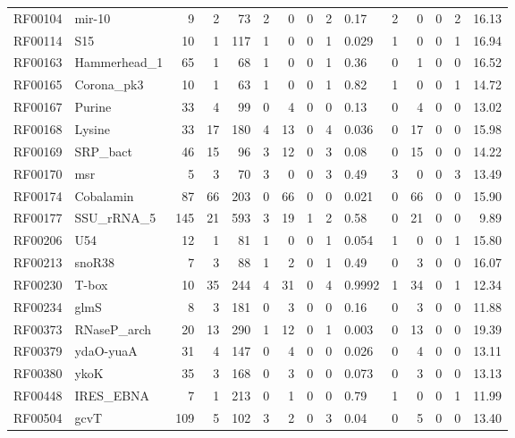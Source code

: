 \begin{table}
\begin{center}
\begin{tabular}{|ll|rrr|rrrrl|rrrrr|}
RF00104 & mir-10 & 9 & 2 & 73 & 2 & 0 & 0 & 2 &   0.17 & 2 & 0 & 0 & 2 &  16.13 \\  
RF00114 & S15 & 10 & 1 & 117 & 1 & 0 & 0 & 1 &  0.029 & 1 & 0 & 0 & 1 &  16.94 \\  
RF00163 & Hammerhead\_1 & 65 & 1 & 68 & 1 & 0 & 0 & 1 &   0.36 & 0 & 1 & 0 & 0 &  16.52 \\  
RF00165 & Corona\_pk3 & 10 & 1 & 63 & 1 & 0 & 0 & 1 &   0.82 & 1 & 0 & 0 & 1 &  14.72 \\  
RF00167 & Purine & 33 & 4 & 99 & 0 & 4 & 0 & 0 &   0.13 & 0 & 4 & 0 & 0 &  13.02 \\  
RF00168 & Lysine & 33 & 17 & 180 & 4 & 13 & 0 & 4 &  0.036 & 0 & 17 & 0 & 0 &  15.98 \\  
RF00169 & SRP\_bact & 46 & 15 & 96 & 3 & 12 & 0 & 3 &   0.08 & 0 & 15 & 0 & 0 &  14.22 \\  
RF00170 & msr & 5 & 3 & 70 & 3 & 0 & 0 & 3 &   0.49 & 3 & 0 & 0 & 3 &  13.49 \\  
RF00174 & Cobalamin & 87 & 66 & 203 & 0 & 66 & 0 & 0 &  0.021 & 0 & 66 & 0 & 0 &   15.90 \\  
RF00177 & SSU\_rRNA\_5 & 145 & 21 & 593 & 3 & 19 & 1 & 2 &   0.58 & 0 & 21 & 0 & 0 &   9.89 \\  
RF00206 & U54 & 12 & 1 & 81 & 1 & 0 & 0 & 1 &  0.054 & 1 & 0 & 0 & 1 &   15.80 \\  
RF00213 & snoR38 & 7 & 3 & 88 & 1 & 2 & 0 & 1 &   0.49 & 0 & 3 & 0 & 0 &  16.07 \\  
RF00230 & T-box & 10 & 35 & 244 & 4 & 31 & 0 & 4 & 0.9992 & 1 & 34 & 0 & 1 &  12.34 \\  
RF00234 & glmS & 8 & 3 & 181 & 0 & 3 & 0 & 0 &   0.16 & 0 & 3 & 0 & 0 &  11.88 \\  
RF00373 & RNaseP\_arch & 20 & 13 & 290 & 1 & 12 & 0 & 1 &  0.003 & 0 & 13 & 0 & 0 &  19.39 \\  
RF00379 & ydaO-yuaA & 31 & 4 & 147 & 0 & 4 & 0 & 0 &  0.026 & 0 & 4 & 0 & 0 &  13.11 \\  
RF00380 & ykoK & 35 & 3 & 168 & 0 & 3 & 0 & 0 &  0.073 & 0 & 3 & 0 & 0 &  13.13 \\  
RF00448 & IRES\_EBNA & 7 & 1 & 213 & 0 & 1 & 0 & 0 &   0.79 & 1 & 0 & 0 & 1 &  11.99 \\  
RF00504 & gcvT & 109 & 5 & 102 & 3 & 2 & 0 & 3 &   0.04 & 0 & 5 & 0 & 0 &   13.40 \\ \hline 

\end{tabular}
\end{center}
\end{table}
